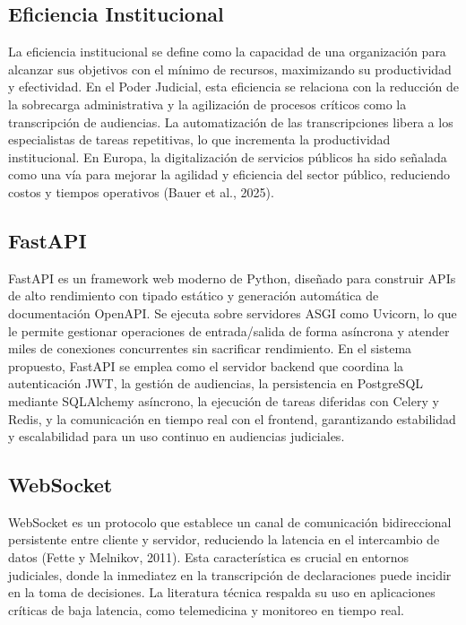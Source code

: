 \documentclass[12pt,a4paper,oneside]{report}
\begin{document}
\subsection{Eficiencia Institucional}

La eficiencia institucional se define como la capacidad de una organización para alcanzar sus objetivos con el mínimo de recursos, maximizando su productividad y efectividad. En el Poder Judicial, esta eficiencia se relaciona con la reducción de la sobrecarga administrativa y la agilización de procesos críticos como la transcripción de audiencias. La automatización de las transcripciones libera a los especialistas de tareas repetitivas, lo que incrementa la productividad institucional. En Europa, la digitalización de servicios públicos ha sido señalada como una vía para mejorar la agilidad y eficiencia del sector público, reduciendo costos y tiempos operativos (Bauer et al., 2025).

\subsection{FastAPI}

FastAPI es un framework web moderno de Python, diseñado para construir APIs de alto rendimiento con tipado estático y generación automática de documentación OpenAPI. Se ejecuta sobre servidores ASGI como Uvicorn, lo que le permite gestionar operaciones de entrada/salida de forma asíncrona y atender miles de conexiones concurrentes sin sacrificar rendimiento. En el sistema propuesto, FastAPI se emplea como el servidor backend que coordina la autenticación JWT, la gestión de audiencias, la persistencia en PostgreSQL mediante SQLAlchemy asíncrono, la ejecución de tareas diferidas con Celery y Redis, y la comunicación en tiempo real con el frontend, garantizando estabilidad y escalabilidad para un uso continuo en audiencias judiciales.

\subsection{WebSocket}

WebSocket es un protocolo que establece un canal de comunicación bidireccional persistente entre cliente y servidor, reduciendo la latencia en el intercambio de datos (Fette y Melnikov, 2011). Esta característica es crucial en entornos judiciales, donde la inmediatez en la transcripción de declaraciones puede incidir en la toma de decisiones. La literatura técnica respalda su uso en aplicaciones críticas de baja latencia, como telemedicina y monitoreo en tiempo real.
\end{document}
